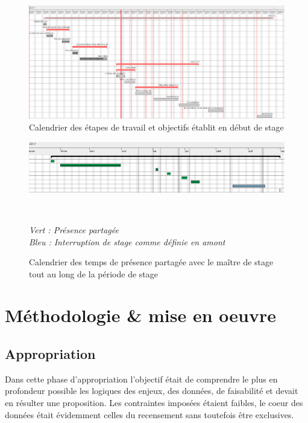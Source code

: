 \documentclass{bredele}
\begin{document}
\begin{figure}\centering
\includegraphics[width=\textwidth]{calendrierV1.png}
\caption{Calendrier des étapes de travail et objectifs établit en début de stage}
\end{figure}
\begin{figure}\centering
\includegraphics[width=\textwidth]{TempsPresencePartagee.png}
\caption{Calendrier des temps de présence partagée avec le maître de stage tout au long de la période de stage} \\ 
\begin{flushleft}
\textit{Vert : Présence partagée \\
Bleu : Interruption de stage comme définie en amont}
\end{flushleft}
\end{figure}
\section{Méthodologie \& mise en oeuvre}
\subsection{Appropriation}
Dans cette phase d'appropriation l'objectif était de comprendre le plus en profondeur possible les logiques des enjeux, des données, de faisabilité et devait en résulter une proposition. Les contraintes imposées étaient faibles, le coeur des données était évidemment celles du recensement sans toutefois être exclusives.
\end{document}
